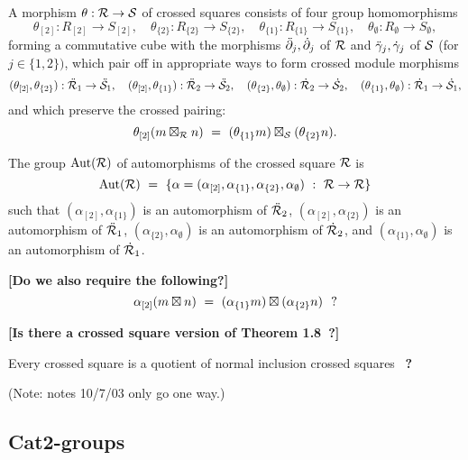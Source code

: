 \begin{defn}
A morphism $\theta : \mathcal{R} \to \mathcal{S}$ of crossed squares
consists of four group homomorphisms
$$
\theta_{[2]} : R_{[2]} \to S_{[2]}, \quad
\theta_{\{2\}} : R_{\{2\}} \to S_{\{2\}}, \quad
\theta_{\{1\}} : R_{\{1\}} \to S_{\{1\}}, \quad
\theta_{\emptyset} : R_{\emptyset} \to S_{\emptyset},
$$
forming a commutative cube with the morphisms 
$\ddot{\partial}_j, \dot{\partial}_j$ of $\mathcal{R}$
and $\ddot{\gamma}_j, \dot{\gamma}_j$ of $\mathcal{S}$ (for $j \in \{1,2\})$,
which pair off in appropriate ways to form crossed module morphisms
$$
(\theta_{[2]},\theta_{\{2\}}) : \ddot{\mathcal{R}}_1 \to \ddot{\mathcal{S}}_1, \quad
(\theta_{[2]},\theta_{\{1\}}) : \ddot{\mathcal{R}}_2 \to \ddot{\mathcal{S}}_2, \quad
(\theta_{\{2\}},\theta_{\emptyset}) : \dot{\mathcal{R}}_2 \to \dot{\mathcal{S}}_2, \quad
(\theta_{\{1\}},\theta_{\emptyset}) : \dot{\mathcal{R}}_1 \to \dot{\mathcal{S}}_1,
$$
and which preserve the crossed pairing: 
$$
\theta_{[2]}(m \boxtimes_{\mathcal{R}} n) ~=~ 
(\theta_{\{1\}} m) \boxtimes_{\mathcal{S}} (\theta_{\{2\}} n).
$$
\end{defn}

\begin{defn} \label{def:aut-xsq} 
The group $\mathrm{Aut}(\mathcal{R})$ of automorphisms of the crossed square $\mathcal{R}$ is 
$$
\mathrm{Aut}(\mathcal{R}) ~=~ \{ \alpha = 
(\alpha_{[2]}, \alpha_{\{1\}}, \alpha_{\{2\}}, \alpha_{\emptyset}) 
 ~:~ \mathcal{R} \to \mathcal{R} \}
$$ 
such that 
$(\alpha_{[2]}, \alpha_{\{1\}}) $  is an automorphism of  $\ddot{\mathcal{R}}_2$,
$(\alpha_{[2]}, \alpha_{\{2\}}) $  is an automorphism of  $\ddot{\mathcal{R}}_1$,
$(\alpha_{\{2\}}, \alpha_{\emptyset}) $  is an automorphism of  $\dot{\mathcal{R}}_2$, and 
$(\alpha_{\{1\}}, \alpha_{\emptyset}) $  is an automorphism of  $\dot{\mathcal{R}}_1$.
\end{defn}

\vspace*{15mm}
\noindent
{\bf [Do we also require the following?]}
$$
\alpha_{[2]}(m \boxtimes n) ~=~ (\alpha_{\{1\}} m) \boxtimes (\alpha_{\{2\}} n)
~~{\bf ?}
$$

\vspace*{15mm}
\noindent
{\bf [Is there a crossed square version of Theorem 1.8~?]}

\begin{thm}
Every crossed square is a quotient of normal inclusion crossed squares~ 
{\bf ?}
\end{thm}

\noindent
(Note: notes 10/7/03 only go one way.)


\newpage
\subsection{Cat2-groups}  \label{subs:cattwo}

